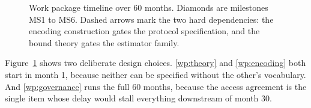 \begin{figure}[htbp]
  \caption{Work package timeline over 60 months. Diamonds are milestones MS1 to MS6. Dashed arrows
  mark the two hard dependencies: the encoding construction gates the protocol specification, and
  the bound theory gates the estimator family.}
  \label{fig:gantt}
\end{figure}

\noindent
Figure~\ref{fig:gantt} shows two deliberate design choices. \ref{wp:theory} and \ref{wp:encoding}
both start in month 1, because neither can be specified without the other's vocabulary. And
\ref{wp:governance} runs the full 60 months, because the access agreement is the single item whose
delay would stall everything downstream of month 30.
